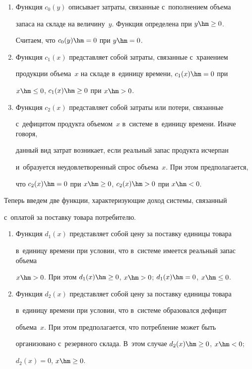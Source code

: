   \begin{enumerate}[1.]

\item Функция $c_0(y)$  описывает затраты, связанные с~пополнением объема 

запаса на складе на величину~$y$. Функция определена при $y\hm\geq 0$. 

Считаем, что $c_0(y)\hm=0$ при $y\hm=0$.

\item Функция  $c_1(x)$ представляет собой затраты, связанные с~хранением 

продукции объема~$x$ на складе в~единицу времени, $c_1(x)\hm=0$ при 

$x\hm\leq0$, $c_1(x)\hm\geq 0$ при $x\hm>0$.

\item Функция $c_2(x)$ представляет собой затраты или потери, связанные 

с~дефицитом продукта объемом~$x$ в~системе в~единицу времени. Иначе говоря, 

данный вид затрат возникает, если реальный запас продукта исчерпан 

и~образуется неудовлетворенный спрос объема~$x$. При этом предполагается, 

что $c_2(x)\hm=0$ при $x\hm\geq 0$, $c_2(x)\hm>0$ при $x\hm<0$.

\end{enumerate}



  Теперь введем две функции, характеризующие доход системы, связанный 

  с~оплатой за поставку товара потребителю.

  \begin{enumerate}[1.]

\item Функция $d_1(x)$ представляет собой цену за поставку единицы товара 

в~единицу времени при условии, что в~системе имеется реальный запас объема 

$x\hm>0$. При этом $d_1(x)\hm\geq0$, $x\hm>0$; $d_1(x)\hm=0$, $x\hm\leq0$.

\item Функция $d_2(x)$ представляет собой цену за поставку единицы товара 

в~единицу времени при условии, что в~системе образовался дефицит 

объема~$x$. При этом предполагается, что потребление может быть 

организовано с~резервного склада. В~этом случае $d_2(x)\hm\geq0$, $x\hm<0$; 

$d_2(x)=0$, $x\hm\geq0$.

\end{enumerate}



